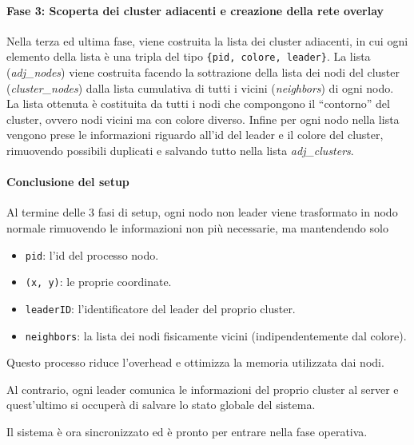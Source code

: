 \documentclass[12pt, a4paper]{report}
\begin{document}
\paragraph{Fase 3: Scoperta dei cluster adiacenti e creazione della rete overlay}
Nella terza ed ultima fase, viene costruita la lista dei cluster adiacenti, in cui ogni elemento della lista \`e una tripla del tipo \texttt{\{pid, colore, leader\}}. La lista (\textit{adj\_nodes}) viene costruita facendo la sottrazione della lista dei nodi del cluster (\textit{cluster\_nodes}) dalla lista cumulativa di tutti i vicini (\textit{neighbors}) di ogni nodo. La lista ottenuta \`e costituita da tutti i nodi che compongono il ``contorno'' del cluster, ovvero nodi vicini ma con colore diverso.
Infine per ogni nodo nella lista vengono prese le informazioni riguardo all'id del leader e il colore del cluster, rimuovendo possibili duplicati e salvando tutto nella lista \textit{adj\_clusters}.

\paragraph{Conclusione del setup}
Al termine delle 3 fasi di setup, ogni nodo non leader viene trasformato in nodo normale rimuovendo le informazioni non pi\`u necessarie, ma mantendendo solo
\begin{itemize}
    \item \texttt{pid}: l'id del processo nodo.
    \item \texttt{(x, y)}: le proprie coordinate.
    \item \texttt{leaderID}: l'identificatore del leader del proprio cluster.
    \item \texttt{neighbors}: la lista dei nodi fisicamente vicini (indipendentemente dal colore).
\end{itemize}
Questo processo riduce l'overhead e ottimizza la memoria utilizzata dai nodi.

Al contrario, ogni leader comunica le informazioni del proprio cluster al server e quest'ultimo si occuper\`a di salvare lo stato globale del sistema.

Il sistema \`e ora sincronizzato ed \`e pronto per entrare nella fase operativa.
\end{document}
